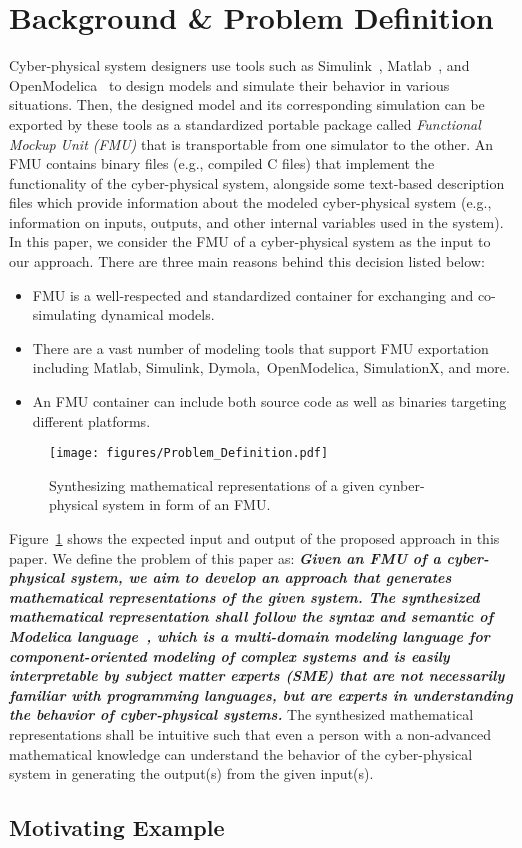 \section{Background \& Problem Definition}
\label{sec:Background}



Cyber-physical system designers use tools such as Simulink~\citeme{}, Matlab~\citeme{}, and OpenModelica~\citeme{} to design models and simulate their behavior in various situations. Then, the designed model and its corresponding simulation can be exported by these tools as a standardized portable package called \textit{Functional Mockup Unit (FMU)} that is transportable from one simulator to the other. An FMU contains binary files (e.g., compiled C files) that implement the functionality of the cyber-physical system, alongside some text-based description files which provide information about the modeled cyber-physical system (e.g., information on inputs, outputs, and other internal variables used in the system). In this paper, we consider the FMU of a cyber-physical system as the input to our approach. There are three main reasons behind this decision listed below:
\begin{itemize}
    \item FMU is a well-respected and standardized container for exchanging and co-simulating dynamical models.
    \item There are a vast number of modeling tools that support FMU exportation including Matlab, Simulink, Dymola, OpenModelica, SimulationX, and more.
    \item An FMU container can include both source code as well as binaries targeting different platforms.
\end{itemize}

\begin{figure}[ht]
  \centering
  \texttt{[image: figures/Problem\_Definition.pdf]}
  \caption{Synthesizing mathematical representations of a given cynber-physical system in form of an FMU.}
  \label{fig:Problem_Definition}
\end{figure}

Figure~\ref{fig:Problem_Definition} shows the expected input and output of the proposed approach in this paper. We define the problem of this paper as: \textbf{\textit{Given an FMU of a cyber-physical system, we aim to develop an approach that generates mathematical representations of the given system. The synthesized mathematical representation shall follow the syntax and semantic of Modelica language~\citeme{}, which is a multi-domain modeling language for component-oriented modeling of complex systems and is easily interpretable by subject matter experts (SME) that are not necessarily familiar with programming languages, but are experts in understanding the behavior of cyber-physical systems.}} The synthesized mathematical representations shall be intuitive such that even a person with a non-advanced mathematical knowledge can understand the behavior of the cyber-physical system in generating the output(s) from the given input(s).



\subsection{Motivating Example}
\label{sec:Motivation}
